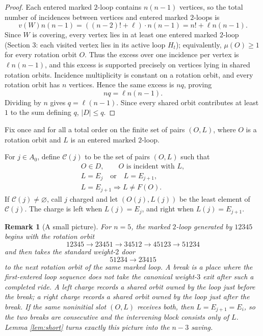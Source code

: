 \documentclass[11pt]{article}
\newtheorem{remark}[theorem]{Remark}
\begin{document}
\begin{proof}
Each entered marked \(2\)-loop contains \(n(n-1)\) vertices, so the total number of incidences
between vertices and entered marked \(2\)-loops is
\[
  v(W)n(n-1)=((n-2)!+\ell)\cdot n(n-1)=n!+\ell n(n-1).
\]
Since \(W\) is covering, every vertex lies in at least one entered marked \(2\)-loop (Section 3:
each visited vertex lies in its active loop \(H_t\)); equivalently, \(\mu(O)\ge1\) for every
rotation orbit \(O\).  Thus the
excess over one incidence per vertex is \(\ell n(n-1)\), and this excess is supported precisely on
vertices lying in shared rotation orbits.  Incidence multiplicity is constant on a rotation orbit,
and every rotation orbit has \(n\) vertices.  Hence the same excess is \(nq\), proving
\[
  nq=\ell n(n-1).
\]
Dividing by \(n\) gives \(q=\ell(n-1)\).  Since every shared orbit contributes at least \(1\) to
the sum defining \(q\), \(|D|\le q\).
\end{proof}

Fix once and for all a total order on the finite set of pairs \((O,L)\), where \(O\) is a rotation
orbit and \(L\) is an entered marked \(2\)-loop.

For \(j\in A_0\), define \(\mathcal C(j)\) to be the set of pairs \((O,L)\) such that
\[
\begin{gathered}
  O\in D,\qquad O\text{ is incident with }L,\\
  L=E_j\quad\text{or}\quad L=E_{j+1},\\
  L=E_{j+1}\Longrightarrow L\ne F(O).
\end{gathered} \tag{7}
\]
If \(\mathcal C(j)\ne\varnothing\), call \(j\) charged and let \((O(j),L(j))\) be the least element
of \(\mathcal C(j)\).  The charge is left when \(L(j)=E_j\), and right when \(L(j)=E_{j+1}\).

\begin{remark}[A small picture]\label{rem:picture}
For \(n=5\), the marked \(2\)-loop generated by \(12345\) begins with the rotation orbit
\[
  12345\to23451\to34512\to45123\to51234
\]
and then takes the standard weight-\(2\) door
\[
  51234\to23415
\]
to the next rotation orbit of the same marked loop.  A break is a place where the first-entered
loop sequence does not take the canonical weight-\(3\) exit after such a completed ride.  A left
charge records a shared orbit owned by the loop just before the break; a right charge records a
shared orbit owned by the loop just after the break.  If the same noninitial slot \((O,L)\) receives
both, then \(L=E_{j+1}=E_i\), so the two breaks are consecutive and the intervening block consists
only of \(L\).  Lemma \ref{lem:short} turns exactly this picture into the \(n-3\) saving.
\end{remark}
\end{document}
